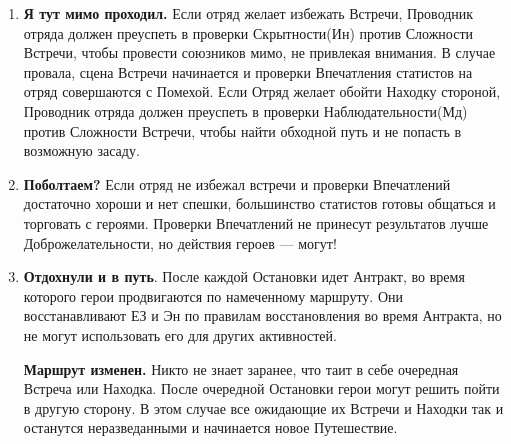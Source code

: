 \begin{enumerate}
\item \textbf{Я тут мимо проходил.} Если отряд желает избежать Встречи, Проводник отряда должен преуспеть в проверки Скрытности(Ин) против Сложности Встречи, чтобы провести союзников мимо, не привлекая внимания. В случае провала, сцена Встречи начинается и проверки Впечатления статистов на отряд совершаются с Помехой.
\newline
Если Отряд желает обойти Находку стороной, Проводник отряда должен преуспеть в проверки Наблюдательности(Мд) против Сложности Встречи, чтобы найти обходной путь и не попасть в возможную засаду.
\item \textbf{Поболтаем?} Если отряд не избежал встречи и проверки Впечатлений достаточно хороши и нет спешки, большинство статистов готовы общаться и торговать с героями. Проверки Впечатлений не принесут результатов лучше Доброжелательности, но действия героев — могут!
\item \textbf{Отдохнули и в путь}. После каждой Остановки идет Антракт, во время которого герои продвигаются по намеченному маршруту. Они восстанавливают ЕЗ и Эн по правилам восстановления во время Антракта, но не могут использовать его для других активностей.
\begin{tcolorbox}
\textbf{Маршрут изменен.} Никто не знает заранее, что таит в себе очередная Встреча или Находка. После очередной Остановки герои могут решить пойти в другую сторону. В этом случае все ожидающие их Встречи и Находки так и останутся неразведанными и начинается новое Путешествие.
\end{tcolorbox}
\end{enumerate}
